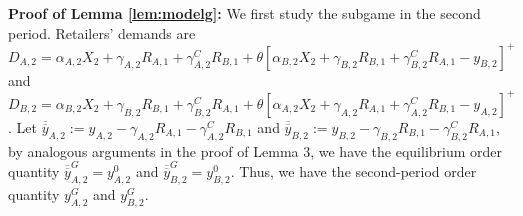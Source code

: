 \documentclass[nonblindrev,copyedit]{informs1}
\begin{document}
\begin{APPENDICES}
{\bf Proof of Lemma \ref{lem:modelg}: } We first study the subgame in the second period. Retailers' demands are $D_{A,2}= \alpha_{A,2} X_2 + \gamma_{A,2}  R_{A,1} + \gamma^C_{A,2} R_{B,1} + \theta \left[\alpha_{B,2} X_2 + \gamma_{B,2} R_{B,1} + \gamma^C_{B,2} R_{A,1} - y_{B,2} \right]^+$ and $D_{B,2} = \alpha_{B,2} X_2 + \gamma_{B,2} R_{B,1} + \gamma^C_{B,2} R_{A,1} + \theta \left[\alpha_{A,2} X_2 + \gamma_{A,2} R_{A,1} + \gamma^C_{A,2} R_{B,1} - y_{A,2} \right]^+$. Let $\overline{\overline{y}}_{A,2} := y_{A,2} -  \gamma_{A,2} R_{A,1} - \gamma^C_{A,2} R_{B,1}$ and $\overline{\overline{y}}_{B,2} := y_{B,2} - \gamma_{B,2} R_{B,1} - \gamma^C_{B,2} R_{A,1} $, by analogous arguments in the proof of Lemma 3, we have the equilibrium order quantity $\overline{\overline{y}}_{A,2}^G = y^0_{A,2}$ and $\overline{\overline{y}}_{B,2}^G = y^0_{B,2}$. Thus, we have the second-period order quantity $y^{G}_{A,2}$ and $y^{G}_{B,2}$.


\end{APPENDICES}
\end{document}
